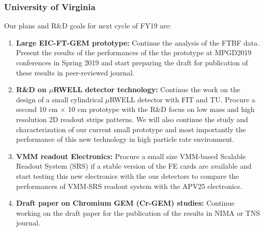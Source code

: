 \subsubsection{University of Virginia} 
Our plans and R\&D goals for next cycle of FY19 are:
%
\begin{enumerate}
%
\item \textbf{Large EIC-FT-GEM prototype:} Continue the analysis of the FTBF data. Present the results of the performances of the the prototype at MPGD2019 conferences in Spring 2019 and start preparing the draft for publication of these results in peer-reviewed journal.
%
\item \textbf{R\&D on $\mu$RWELL detector technology:} Continue the work on the design of a small cylindrical  $\mu$RWELL detector with FIT and TU. Procure a second 10 cm $\times$ 10 cm prototype with the R\&D focus on low mass and high resolution 2D readout strips patterns. We will also continue the study and characterization of our current small prototype and most importantly the performance of this new technology in high particle rate environment. 
%
\item \textbf{VMM readout Electronics:} Procure a small size VMM-based Scalable Readout System (SRS) if  a stable version of the FE cards are available and start testing this new  electronics with the our detectors to compare the performances of VMM-SRS readout system with the APV25 electronics.
%
\item \textbf{Draft paper on Chromium GEM (Cr-GEM) studies:}  Continue working on the draft  paper for the publication of the results in NIMA or TNS journal.
\end{enumerate}